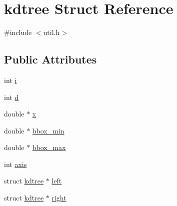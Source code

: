 \hypertarget{structkdtree}{
\section{kdtree Struct Reference}
\label{structkdtree}
}


{\ttfamily \#include $<$util.h$>$}

\subsection*{Public Attributes}
\begin{DoxyCompactItemize}
\item 
int \hyperlink{structkdtree_ad544e0ad81ac0f012d6ca3ba1abbb857}{i}
\item 
int \hyperlink{structkdtree_a0ca03bfa1fdb3b13b81bb963ee11031b}{d}
\item 
double $\ast$ \hyperlink{structkdtree_a08dfd21f2dd52dcffe4ebca4db65636f}{x}
\item 
double $\ast$ \hyperlink{structkdtree_ab667f9dfcc50b9e2ae470f091b890e11}{bbox\_\-min}
\item 
double $\ast$ \hyperlink{structkdtree_afab5e60d86f6434f76ea43d6568416fe}{bbox\_\-max}
\item 
int \hyperlink{structkdtree_aa3e8af96c003f2657f8dc9e54dab83fb}{axis}
\item 
struct \hyperlink{structkdtree}{kdtree} $\ast$ \hyperlink{structkdtree_aea8386a2f0d15772aad52cb12f14b195}{left}
\item 
struct \hyperlink{structkdtree}{kdtree} $\ast$ \hyperlink{structkdtree_aeff4c4ef599811a65674ab2a1eb49f6f}{right}
\end{DoxyCompactItemize}


